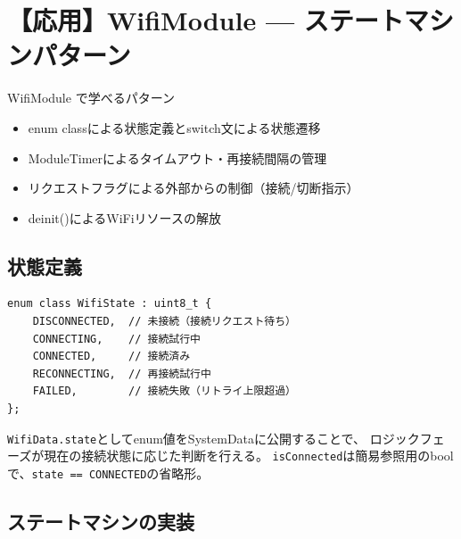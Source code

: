 \section{【応用】WifiModule — ステートマシンパターン}

\begin{patternbox}{WifiModule で学べるパターン}
\begin{itemize}
    \item enum classによる状態定義とswitch文による状態遷移
    \item ModuleTimerによるタイムアウト・再接続間隔の管理
    \item リクエストフラグによる外部からの制御（接続/切断指示）
    \item deinit()によるWiFiリソースの解放
\end{itemize}
\end{patternbox}

\subsection{状態定義}

\begin{lstlisting}[style=cppstyle, caption={WifiModule.h — 状態定義}]
enum class WifiState : uint8_t {
    DISCONNECTED,  // 未接続（接続リクエスト待ち）
    CONNECTING,    // 接続試行中
    CONNECTED,     // 接続済み
    RECONNECTING,  // 再接続試行中
    FAILED,        // 接続失敗（リトライ上限超過）
};
\end{lstlisting}

\begin{pointbox}[Data構造体にステートを公開]
\texttt{WifiData.state}としてenum値をSystemDataに公開することで、
ロジックフェーズが現在の接続状態に応じた判断を行える。
\texttt{isConnected}は簡易参照用のboolで、\texttt{state == CONNECTED}の省略形。
\end{pointbox}

\subsection{ステートマシンの実装}

